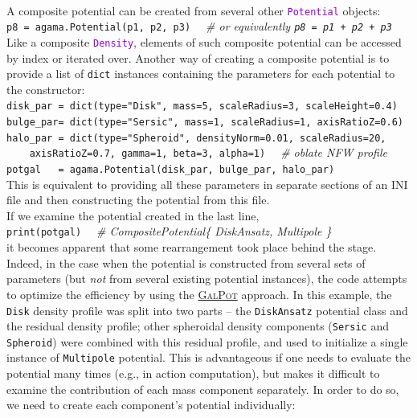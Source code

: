 \documentclass[12pt]{article}
\newcommand{\ttt}[1]{\textcolor{darkviolet}{\texttt{#1}}}
\newcommand{\ppp}[1]{\textcolor{darkolive} {\texttt{#1}}}
\begin{document}
\\[2mm]
A composite potential can be created from several other \ttt{Potential} objects:\\
\texttt{p8 = agama.Potential(p1, p2, p3)} \textit{\color{Sepia} \ \ \# or equivalently \texttt{p8 = p1 + p2 + p3}}\\[2mm]
Like a composite \ttt{Density}, elements of such composite potential can be accessed by index or iterated over.
Another way of creating a composite potential is to provide a list of \texttt{dict} instances containing the parameters for each potential to the constructor:\\
\texttt{disk_par = dict(type="Disk", mass=5, scaleRadius=3, scaleHeight=0.4)}\\
\texttt{bulge_par= dict(type="Sersic", mass=1, scaleRadius=1, axisRatioZ=0.6)}\\
\texttt{halo_par = dict(type="Spheroid", densityNorm=0.01, scaleRadius=20,\\
\mbox{}~~~~axisRatioZ=0.7, gamma=1, beta=3, alpha=1)} \textit{\color{Sepia}\ \ \# oblate NFW profile}\\
\texttt{potgal~~~= agama.Potential(disk_par, bulge_par, halo_par)}\\
This is equivalent to providing all these parameters in separate sections of an INI file and then constructing the potential from this file.\\[2mm]
If we examine the potential created in the last line,\\
\texttt{print(potgal)}  \textit{\color{Sepia} \ \ \# CompositePotential\{ DiskAnsatz, Multipole \}}\\
it becomes apparent that some rearrangement took place behind the stage. Indeed, in the case when the potential is constructed from several sets of parameters (but \textit{not} from several existing potential instances), the code attempts to optimize the efficiency by using the \hyperref[sec:PotentialGalpot]{\textsc{GalPot}} approach. In this example, the \ppp{Disk} density profile was split into two parts -- the \ppp{DiskAnsatz} potential class and the residual density profile; other spheroidal density components (\ppp{Sersic} and \ppp{Spheroid}) were combined with this residual profile, and used to initialize a single instance of \ppp{Multipole} potential. This is advantageous if one needs to evaluate the potential many times (e.g., in action computation), but makes it difficult to examine the contribution of each mass component separately. In order to do so, we need to create each component's potential individually:\\
\end{document}
